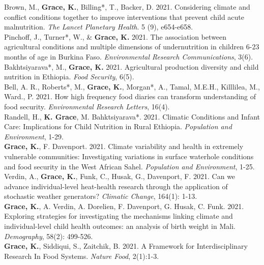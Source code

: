 \documentclass[11pt]{article} %
\begin{document}
\noindent
Brown, M., \textbf{Grace, K.}, Billing*, T., Backer, D. 2021. Considering climate and conflict conditions together to improve interventions that prevent child acute malnutrition. \textit{The Lancet Planetary Health}. 5 (9), e654-e658.\\

\noindent
Pinchoff, J., Turner*, W., \& \textbf{Grace, K.} 2021. The association between agricultural conditions and multiple dimensions of undernutrition in children 6-23 months of age in Burkina Faso. \textit{Environmental Research Communications}, 3(6).\\

\noindent
Bakhtsiyarava*, M., \textbf{Grace, K.} 2021. Agricultural production diversity and child nutrition in Ethiopia. \textit{Food Security}, 6(5).\\

\noindent 
Bell, A. R., Roberts*, M., \textbf{Grace, K.}, Morgan*, A., Tamal, M.E.H., Killlilea, M., Ward., P. 2021. How high frequency food diaries can transform understanding of food security.  \textit{Environmental Research Letters}, 16(4).\\

\noindent
Randell, H., \textbf{K. Grace}, M. Bahktsiyarava*. 2021. Climatic Conditions and Infant Care: Implications for Child Nutrition in Rural Ethiopia. \textit{Population and Environment}, 1-29.\\

\noindent
\textbf{Grace, K.}, F. Davenport. 2021. Climate variability and health in extremely vulnerable communities: Investigating variations in surface waterhole conditions and food security in the West African Sahel. \textit{Population and Environment},  1-25.\\

\noindent
Verdin, A., \textbf{Grace, K.}, Funk, C., Husak, G., Davenport, F. 2021. Can we advance individual-level heat-health research through the application of stochastic weather generators? \textit{Climatic Change}, 164(1): 1-13.\\

\noindent
\textbf{Grace, K.}, A. Verdin, A. Dorelien, F. Davenport, G. Husak, C. Funk. 2021. Exploring strategies for investigating the mechanisms linking climate and individual-level child health outcomes: an analysis of birth weight in Mali. \textit{Demography}, 58(2): 499-526.\\

\noindent
\textbf{Grace, K.}, Siddiqui, S., Zaitchik, B. 2021. A Framework for Interdisciplinary Research In Food Systems. \textit{Nature Food}, 2(1):1-3.\\
\end{document}
